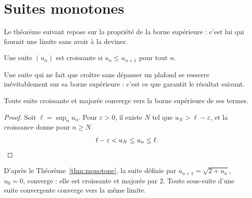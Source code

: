 \section{Suites monotones}%

Le théorème suivant repose sur la propriété de la borne supérieure : c'est
lui qui fournit une limite sans avoir à la deviner.

\begin{definition}[title=Suite croissante]
    Une suite $(u_n)$ est croissante si $u_n \le u_{n+1}$ pour tout $n$.
\end{definition}

Une suite qui ne fait que croître sans dépasser un plafond se resserre
inévitablement sur sa borne supérieure : c'est ce que garantit le résultat
suivant.

\begin{theorem}[title=Limite monotone, label=thm:monotone]
    Toute suite croissante et majorée converge vers la borne supérieure de
    ses termes.
\end{theorem}

\begin{proof}
    Soit $\ell = \sup_n u_n$. Pour $\varepsilon > 0$, il existe $N$ tel que
    $u_N > \ell - \varepsilon$, et la croissance donne pour $n \ge N$
    \[
        \ell - \varepsilon < u_N \le u_n \le \ell. \qedhere
    \]
\end{proof}

D'après le Théorème~\ref{thm:monotone}, la suite définie par
$u_{n+1} = \sqrt{2 + u_n}$, $u_0 = 0$, converge : elle est croissante et
majorée par $2$. Toute sous-suite d'une suite convergente converge vers la
même limite.
